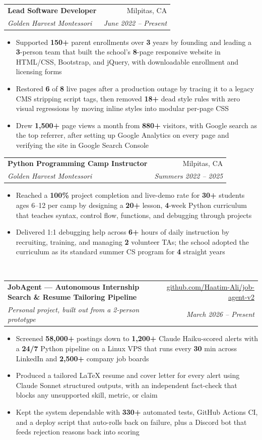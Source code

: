 \documentclass[letterpaper,10pt]{article}
\makeatletter
\newcommand{\resitem}[1]{\item #1 \vspace{-6pt}}
\newcommand{\resheading}[1]{\vspace{7pt}{\Large \textbf{#1}}\\\vspace{-8pt}\hrulefill}
\newcommand{\ressubheading}[4]{\vspace{2pt}
\begin{tabular*}{7.0in}{l@{\cftdotfill{\cftsecdotsep}\extracolsep{\fill}}r}
        \textbf{#1} & #2 \\
        \textit{#3} & \textit{#4} \\
\end{tabular*}\vspace{-6pt}}
\makeatother
\begin{document}
\ressubheading{Lead Software Developer}{Milpitas, CA}{Golden Harvest Montessori}{June 2022 -- Present}
\begin{itemize}
    \resitem{Supported \textbf{150+} parent enrollments over \textbf{3} years by founding and leading a \textbf{3}-person team that built the school's \textbf{8}-page responsive website in HTML/CSS, Bootstrap, and jQuery, with downloadable enrollment and licensing forms}
    \resitem{Restored \textbf{6} of \textbf{8} live pages after a production outage by tracing it to a legacy CMS stripping script tags, then removed \textbf{18+} dead style rules with zero visual regressions by moving inline styles into modular per-page CSS}
    \resitem{Drew \textbf{1,500+} page views a month from \textbf{880+} visitors, with Google search as the top referrer, after setting up Google Analytics on every page and verifying the site in Google Search Console}
\end{itemize}

\ressubheading{Python Programming Camp Instructor}{Milpitas, CA}{Golden Harvest Montessori}{Summers 2022 -- 2025}
\begin{itemize}
    \resitem{Reached a \textbf{100\%} project completion and live-demo rate for \textbf{30+} students ages 6--12 per camp by designing a \textbf{20+} lesson, \textbf{4}-week Python curriculum that teaches syntax, control flow, functions, and debugging through projects}
    \resitem{Delivered 1:1 debugging help across \textbf{6+} hours of daily instruction by recruiting, training, and managing \textbf{2} volunteer TAs; the school adopted the curriculum as its standard summer CS program for \textbf{4} straight years}
\end{itemize}

\resheading{Projects}

\ressubheading{JobAgent --- Autonomous Internship Search \& Resume Tailoring Pipeline}{\href{https://github.com/Haatim-Ali/job-agent-v2}{github.com/Haatim-Ali/job-agent-v2}}{Personal project, built out from a 2-person prototype}{March 2026 -- Present}
\begin{itemize}
    \resitem{Screened \textbf{58,000+} postings down to \textbf{1,200+} Claude Haiku-scored alerts with a \textbf{24/7} Python pipeline on a Linux VPS that runs every \textbf{30} min across LinkedIn and \textbf{2,500+} company job boards}
    \resitem{Produced a tailored LaTeX resume and cover letter for every alert using Claude Sonnet structured outputs, with an independent fact-check that blocks any unsupported skill, metric, or claim}
    \resitem{Kept the system dependable with \textbf{330+} automated tests, GitHub Actions CI, and a deploy script that auto-rolls back on failure, plus a Discord bot that feeds rejection reasons back into scoring}
\end{itemize}
\end{document}
